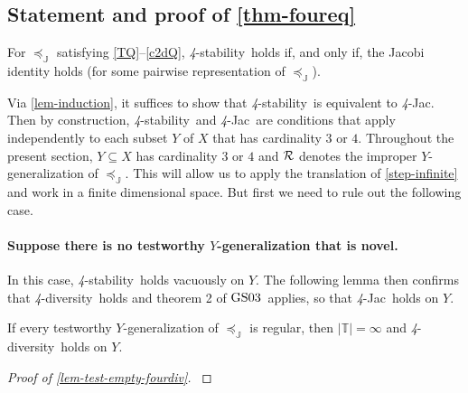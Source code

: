 \documentclass[12pt,a4paper,twoside]{article}
\makeatletter
\newcommand{\srcsize}{\@setfontsize{\srcsize}{3pt}{3pt}}
\newcommand{\gsii}{$\textup{GS03}$}
\newcommand\mplus{\text{\srcsize$+$}}
\newcommand{\ext}{\mathrel{\mc R}}
\newcommand{\mbbc}{{\mathds C}}
\newcommand{\mbbt}{{\mathds {T}}}
\newcommand{\mbbj}{\mathds J}
\newcommand{\stability}{\textit{4}-\textup{{stability}}}
\newcommand{\fourdiv}{\textit{4}-\textup{diversity}}
\newcommand{\fourjac}{\textup{\textit{4}-Jac}}
\makeatother
\begin{document}
\begin{appendices}
\section{Statement and proof of \cref{thm-foureq}}\label{sec-proof-foureq}
 \begin{theorem}\label{thm-foureq}
   For $\preceq_{\mbbj}$ satisfying \ref{TQ}--\ref{c2dQ}, \stability\ holds if,
   and only if, the Jacobi identity holds (for some pairwise representation of
   $\preceq_{\mbbj}$).
 \end{theorem}
 Via \cref{lem-induction}, it suffices to show that \stability\ is equivalent
 to \fourjac. Then by construction, \stability\ and \fourjac\ are conditions
 that apply independently to each subset $Y$ of $X$ that has cardinality $3$ or
 $4$.  Throughout the present section, $Y\subseteq X$ has cardinality $3$ or
 $4$ and $\ext$ denotes the improper $Y$-{generalization} of $\preceq_{\mbbj}$.
 This will allow us to apply the translation of \cref{step-infinite} and work
 in a finite dimensional space. But first we need to rule out the following
 case.  \paragraph{Suppose there is no testworthy $Y$-{generalization} that is
 novel.}\hskip-7pt In this case, \stability\ holds vacuously on $Y$. The
 following lemma then confirms that \fourdiv\ holds and theorem 2 of
 \gsii\ applies, so that \fourjac\ holds on $Y$.
\begin{lemma}\label{lem-test-empty-fourdiv}
  If every testworthy $Y$-{generalization} of $\preceq_{\mbbj}$ is regular,
  then $\lvert \mbbt \rvert = \infty$ and \fourdiv\ holds on $Y$.
\end{lemma}

\begin{proof}[Proof of \cref{lem-test-empty-fourdiv}] \label{proof-test-empty-fourdiv}


\end{proof}
\end{appendices}
\end{document}

